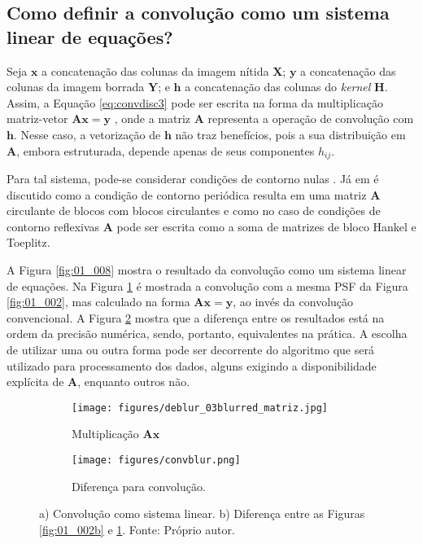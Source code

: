 \subsection{Como definir a convolução como um sistema linear de equações?}

Seja $\mathbf{x}$ a concatenação das colunas da imagem nítida $\mathbf{X}$; $\mathbf{y}$ a concatenação das colunas da imagem borrada $\mathbf{Y}$; e $\mathbf{h}$ a concatenação das colunas do \textit{kernel} $\mathbf{H}$. Assim, a Equação \eqref{eq:convdisc3} pode ser escrita na forma da multiplicação matriz-vetor $\mathbf{A}\mathbf{x} = \mathbf{y}$ \cite[Cap. 4]{hansen2006deblurring}, onde a matriz $\mathbf{A}$ representa a operação de convolução com $\mathbf{h}$. Nesse caso, a vetorização de $\mathbf{h}$ não traz benefícios, pois a sua distribuição em $\mathbf{A}$, embora estruturada, depende apenas de seus componentes $h_{ij}$. 


Para tal sistema, pode-se considerar condições de contorno nulas \cite[pág. 37]{hansen2006deblurring}. Já em \cite[pág. 38]{hansen2006deblurring} é discutido como a condição de contorno periódica resulta em uma matriz $\mathbf{A}$ circulante de blocos com blocos circulantes e como no caso de condições de contorno reflexivas $\mathbf{A}$ pode ser escrita como a soma de matrizes de bloco Hankel e Toeplitz. 

A Figura \ref{fig:01_008} mostra o resultado da convolução como um sistema linear de equações.  Na Figura \ref{fig:bludifa} é mostrada a convolução com a mesma PSF da Figura \ref{fig:01_002}, mas calculado na forma $\mathbf{A}\mathbf{x} = \mathbf{y}$, ao invés da convolução convencional. A Figura \ref{fig:bludifb} mostra que a diferença entre os resultados está na ordem da precisão numérica, sendo, portanto, equivalentes na prática. A escolha de utilizar uma ou outra forma pode ser decorrente do algoritmo que será utilizado para processamento dos dados, alguns exigindo a disponibilidade explícita de $\mathbf{A}$, enquanto outros não.

\begin{figure}[H]
     \centering
     \begin{subfigure}[b]{0.37\textwidth}
         \centering
         \texttt{[image: figures/deblur\_03blurred\_matriz.jpg]}
         \caption{Multiplicação $\mathbf{A}\mathbf{x}$}
         \label{fig:bludifa}
     \end{subfigure}     
     \begin{subfigure}[b]{0.37\textwidth}
         \centering
                  \texttt{[image: figures/convblur.png]}
         \caption{Diferença para convolução.}
         \label{fig:bludifb}
     \end{subfigure}
\caption[a) Convolução como sistema linear. b) Diferença entre as Figuras \ref{fig:01_002b} e \ref{fig:bludifa}.]{a) Convolução como sistema linear. b) Diferença entre as Figuras \ref{fig:01_002b} e \ref{fig:bludifa}. Fonte: Próprio autor.}
\label{fig:bludif}
\end{figure}





